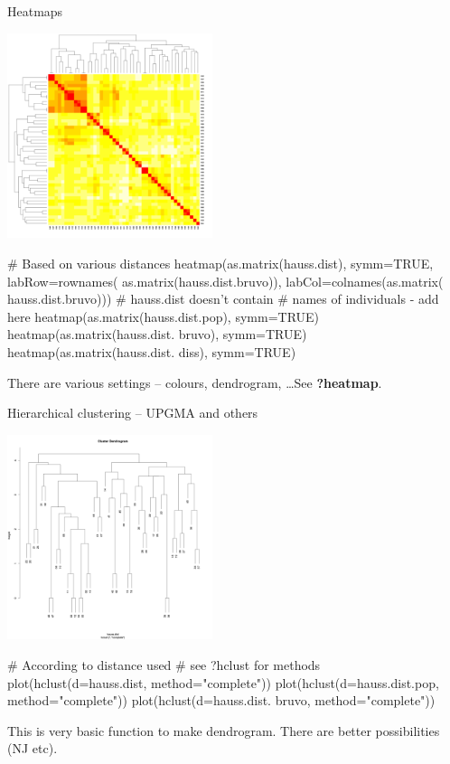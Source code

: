 \documentclass[compress, ucs, xelatex, 11pt, xcolor=svgnames,
  hyperref={
    bookmarks=true,
    unicode=true,
    colorlinks=true,
    pdftitle={Molecular data in R},
    plainpages=false,
    pdfauthor={Vojtech Zeisek},
    pdfsubject={Course about phylogeny and evolution in R},
    pdfcreator={XeLaTeX},
    pdfkeywords={R, evolution, phylogeny, molecular data},
    linkcolor=Tomato,
    anchorcolor=SaddleBrown,
    citecolor=Goldenrod,
    filecolor=DarkMagenta,
    menucolor=Sienna,
    urlcolor=DarkTurquoise,
    pdftex},
  url={hyphens, lowtilde} %
  ]{beamer}
\begin{document}
\begin{frame}[fragile]{Heatmaps}
\begin{multicols}{2}
  \includegraphics[height=6cm]{heatmap.png}
  \columnbreak
  \begin{spluscode}
    # Based on various distances
    heatmap(as.matrix(hauss.dist),
      symm=TRUE, labRow=rownames(
      as.matrix(hauss.dist.bruvo)),
      labCol=colnames(as.matrix(
      hauss.dist.bruvo)))
      # hauss.dist doesn't contain
      # names of individuals - add here
    heatmap(as.matrix(hauss.dist.pop),
      symm=TRUE)
    heatmap(as.matrix(hauss.dist.
      bruvo), symm=TRUE)
    heatmap(as.matrix(hauss.dist.
      diss), symm=TRUE)
  \end{spluscode}
\end{multicols}
\begin{footnotesize}
  There are various settings -- colours, dendrogram, \ldots See \textbf{?heatmap}.
\end{footnotesize}
\vfil
\end{frame}

\begin{frame}[fragile]{Hierarchical clustering -- UPGMA and others}
\begin{multicols}{2}
  \includegraphics[height=6cm]{hierclust.png}
  \begin{spluscode}
    # According to distance used
    # see ?hclust for methods
    plot(hclust(d=hauss.dist,
      method="complete"))
    plot(hclust(d=hauss.dist.pop,
      method="complete"))
    plot(hclust(d=hauss.dist.
      bruvo, method="complete"))
  \end{spluscode}
  This is very basic function to make dendrogram. There are better possibilities (NJ etc).
\end{multicols}
\end{frame}
\end{document}
